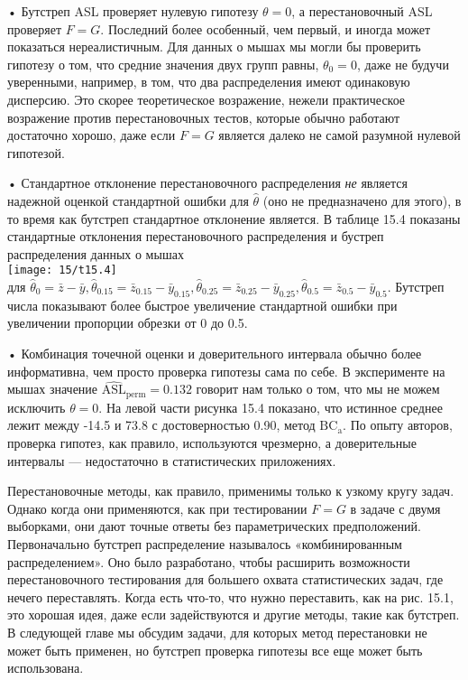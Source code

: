 • Бутстреп ASL проверяет нулевую гипотезу $\theta = 0$, а перестановочный ASL проверяет $F = G$. Последний более особенный, чем первый, и иногда может показаться нереалистичным. Для данных о мышах мы могли бы проверить гипотезу о том, что средние значения двух групп равны, $\theta_0 = 0$, даже не будучи уверенными, например, в том, что два распределения имеют одинаковую дисперсию. Это скорее теоретическое возражение, нежели практическое возражение против перестановочных тестов, которые обычно работают достаточно хорошо, даже если $F = G$ является далеко не самой разумной нулевой гипотезой.

• Стандартное отклонение перестановочного распределения \textit{не} является надежной оценкой стандартной ошибки для $\hat{\theta}$ (оно не предназначено для этого), в то время как бутстреп стандартное отклонение является. В таблице 15.4 показаны стандартные отклонения перестановочного распределения и бустреп распределения данных о мышах\\
\noindent
\texttt{[image: 15/t15.4]}
\newline\\
\noindent для $\hat{\theta}_0 = \bar{z} - \bar{y}, \hat{\theta}_{0.15} = \bar{z}_{0.15} - \bar{y}_{0.15}, \hat{\theta}_{0.25} = \bar{z}_{0.25} - \bar{y}_{0.25}, \hat{\theta}_{0.5} = \bar{z}_{0.5} - \bar{y}_{0.5}$. Бутстреп числа показывают более быстрое увеличение стандартной ошибки при увеличении пропорции обрезки от 0 до 0.5.

• Комбинация точечной оценки и доверительного интервала обычно более информативна, чем просто проверка гипотезы сама по себе. В эксперименте на мышах значение $\widehat{\text{ASL}}_\text{perm} = 0.132$ говорит нам только о том, что мы не можем исключить $\theta = 0$. На левой части рисунка 15.4 показано, что истинное среднее лежит между -14.5 и 73.8 с достоверностью 0.90, метод $\text{BC}_{\text{a}}$. По опыту авторов, проверка гипотез, как правило, используются чрезмерно, а доверительные интервалы --- недостаточно в статистических приложениях.

Перестановочные методы, как правило, применимы только к узкому кругу задач. Однако когда они применяются, как при тестировании $F = G$ в задаче с двумя выборками, они дают точные ответы без параметрических предположений. Первоначально бутстреп распределение называлось «комбинированным распределением». Оно было разработано, чтобы расширить возможности перестановочного тестирования для большего охвата статистических задач, где нечего переставлять. Когда есть что-то, что нужно переставить, как на рис. 15.1, это хорошая идея, даже если задействуются и другие методы, такие как бутстреп. В следующей главе мы обсудим задачи, для которых метод перестановки не может быть применен, но бутстреп проверка гипотезы все еще может быть использована.